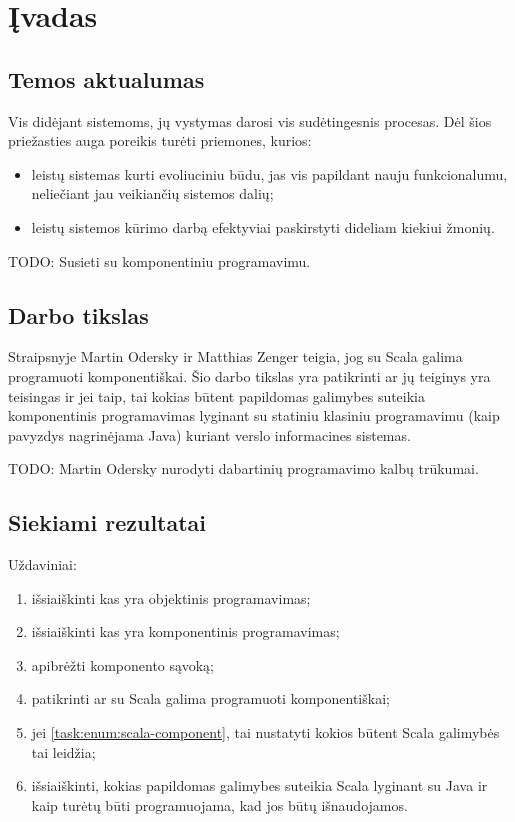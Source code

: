 \chapter{Įvadas}

\section{Temos aktualumas}

Vis didėjant sistemoms, jų vystymas darosi vis sudėtingesnis procesas.
Dėl šios priežasties auga poreikis turėti priemones, kurios:
\begin{itemize}
  \item leistų sistemas kurti evoliuciniu būdu, jas vis papildant nauju
    funkcionalumu, neliečiant jau veikiančių sistemos dalių;
  \item leistų sistemos kūrimo darbą efektyviai paskirstyti dideliam
    kiekiui žmonių.
\end{itemize}
TODO: Susieti su komponentiniu programavimu.

\section{Darbo tikslas}

Straipsnyje \cite{scalable-component-abstractions} Martin Odersky
ir Matthias Zenger teigia, jog su Scala galima programuoti
komponentiškai. Šio darbo tikslas yra patikrinti ar jų teiginys yra
teisingas ir jei taip, tai kokias būtent papildomas galimybes
suteikia komponentinis programavimas lyginant su statiniu
klasiniu programavimu (kaip pavyzdys nagrinėjama Java) kuriant verslo
informacines sistemas.

TODO: Martin Odersky nurodyti dabartinių programavimo kalbų trūkumai.

\section{Siekiami rezultatai}

Uždaviniai:
\begin{enumerate}
  \item išsiaiškinti kas yra objektinis programavimas;
  \item išsiaiškinti kas yra komponentinis programavimas;
  \item apibrėžti komponento sąvoką;
  \item \label{task:enum:scala-component} patikrinti ar su Scala galima
    programuoti komponentiškai;
  \item jei \ref{task:enum:scala-component}, tai nustatyti kokios
    būtent Scala galimybės tai leidžia;
  \item išsiaiškinti, kokias papildomas galimybes suteikia Scala
    lyginant su Java ir kaip turėtų būti programuojama, kad jos
    būtų išnaudojamos.
\end{enumerate}

